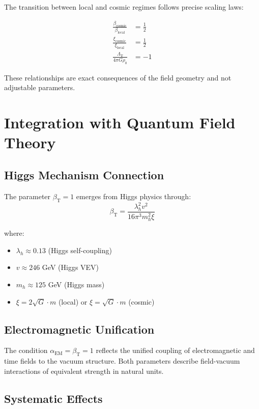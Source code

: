 \documentclass[12pt,a4paper]{article}
\newcommand{\betaT}{\beta_{\text{T}}}
\newcommand{\alphaEM}{\alpha_{\text{EM}}}
\newcommand{\LambdaT}{\Lambda_{\text{T}}}
\begin{document}
	The transition between local and cosmic regimes follows precise scaling laws:
	
	\begin{align}
		\frac{\beta_{\text{cosmic}}}{\beta_{\text{local}}} &= \frac{1}{2} \\
		\frac{\xi_{\text{cosmic}}}{\xi_{\text{local}}} &= \frac{1}{2} \\
		\frac{\LambdaT}{4\pi G \rho_0} &= -1
	\end{align}
	
	These relationships are exact consequences of the field geometry and not adjustable parameters.
	
	\section{Integration with Quantum Field Theory}
	\label{sec:qft_integration}
	
	\subsection{Higgs Mechanism Connection}
	\label{subsec:higgs_connection}
	
	The parameter $\betaT = 1$ emerges from Higgs physics through:
	\begin{equation}
		\betaT = \frac{\lambda_h^2 v^2}{16\pi^3 m_h^2 \xi}
	\end{equation}
	
	where:
	\begin{itemize}
		\item $\lambda_h \approx 0.13$ (Higgs self-coupling)
		\item $v \approx 246$ GeV (Higgs VEV)
		\item $m_h \approx 125$ GeV (Higgs mass)
		\item $\xi = 2\sqrt{G} \cdot m$ (local) or $\xi = \sqrt{G} \cdot m$ (cosmic)
	\end{itemize}
	
	\subsection{Electromagnetic Unification}
	\label{subsec:em_unification}
	
	The condition $\alphaEM = \betaT = 1$ reflects the unified coupling of electromagnetic and time fields to the vacuum structure. Both parameters describe field-vacuum interactions of equivalent strength in natural units.
	
	
	\subsection{Systematic Effects}
	\label{subsec:systematic_effects}
	
\end{document}
